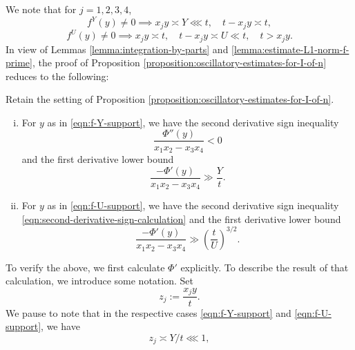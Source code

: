 \documentclass[reqno]{amsart} 
\begin{document}
We note that for $j = 1,2,3,4$,
\begin{equation}\label{eqn:f-Y-support}
  f^Y(y) \neq 0 \implies x_j y \asymp Y \lll t, \quad t- x_j y \asymp t,
\end{equation}
\begin{equation}\label{eqn:f-U-support}
  f^U(y) \neq 0 \implies x_j y \asymp t, \quad t - x_j y \asymp U \ll t, \quad t > x_j y.
\end{equation}
In view of Lemmas \ref{lemma:integration-by-parts} and \ref{lemma:estimate-L1-norm-f-prime}, the proof of Proposition \ref{proposition:oscillatory-estimates-for-I-of-n} reduces to the following:
\begin{proposition}\label{proposition:cqx50a22sj}
  Retain the setting of  Proposition \ref{proposition:oscillatory-estimates-for-I-of-n}.
  \begin{enumerate}[(i)]
  \item For $y$ as in \eqref{eqn:f-Y-support}, we have the second derivative sign inequality
    \begin{equation}\label{eqn:second-derivative-sign-calculation}
      \frac{\Phi ''(y)}{x_1 x_2 - x_3 x_4} < 0
    \end{equation}
    and the first derivative lower bound
    \begin{equation}\label{eqn:Phi-prime-lower-bound-Y}
      \frac{-\Phi '(y)}{x_1 x_2 - x_3 x_4} \gg \frac{Y}{t}.
    \end{equation}
  \item For $y$ as in \eqref{eqn:f-U-support}, we have the second derivative sign inequality \eqref{eqn:second-derivative-sign-calculation} and the first derivative lower bound
    \begin{equation}\label{eqn:Phi-prime-lower-bound-U}
      \frac{-\Phi '(y)}{ x_1 x_2 - x_3 x_4} \gg \left( \frac{t}{U} \right) ^{3/2}.
    \end{equation}  
  \end{enumerate}
\end{proposition}
To verify the above, we first calculate $\Phi '$ explicitly.  To describe the result of that calculation, we introduce some notation.  Set
\begin{equation*}
  z_j := \frac{x _j y }{t }.
\end{equation*}
We pause to note that in the respective cases \eqref{eqn:f-Y-support} and \eqref{eqn:f-U-support}, we have
\begin{equation*}
  z_j \asymp Y/t \lll 1,
\end{equation*}
\end{document}
